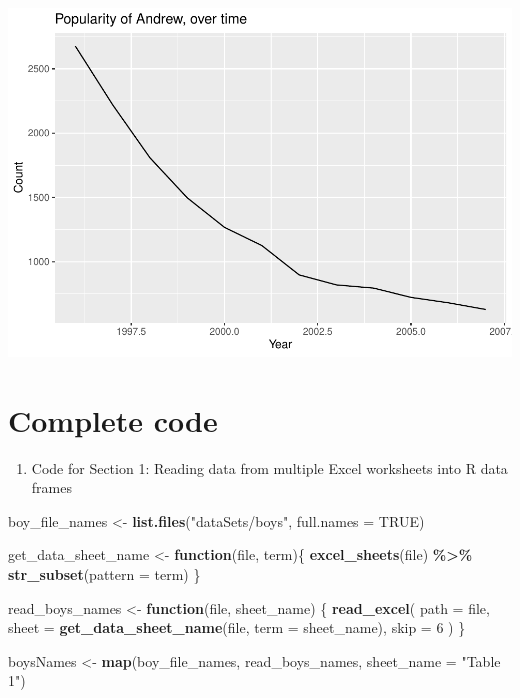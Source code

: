 \documentclass[
]{book}
\newenvironment{Shaded}{\begin{snugshade}}{\end{snugshade}}
\newcommand{\ControlFlowTok}[1]{\textcolor[rgb]{0.13,0.29,0.53}{\textbf{#1}}}
\newcommand{\DataTypeTok}[1]{\textcolor[rgb]{0.13,0.29,0.53}{#1}}
\newcommand{\DecValTok}[1]{\textcolor[rgb]{0.00,0.00,0.81}{#1}}
\newcommand{\KeywordTok}[1]{\textcolor[rgb]{0.13,0.29,0.53}{\textbf{#1}}}
\newcommand{\NormalTok}[1]{#1}
\newcommand{\OperatorTok}[1]{\textcolor[rgb]{0.81,0.36,0.00}{\textbf{#1}}}
\newcommand{\OtherTok}[1]{\textcolor[rgb]{0.56,0.35,0.01}{#1}}
\newcommand{\StringTok}[1]{\textcolor[rgb]{0.31,0.60,0.02}{#1}}
\providecommand{\tightlist}{%
  \setlength{\itemsep}{0pt}\setlength{\parskip}{0pt}}
\begin{document}
\begin{alert}
\includegraphics{R/RDataWrangling/figures/unnamed-chunk-260-1.pdf}

\end{alert}

\hypertarget{complete-code}{%
\section{Complete code}\label{complete-code}}

\begin{enumerate}
\def\labelenumi{\arabic{enumi}.}
\tightlist
\item
  Code for Section 1: Reading data from multiple Excel worksheets into R data frames
\end{enumerate}

\begin{Shaded}
\begin{Highlighting}[]
\NormalTok{boy\_file\_names \textless{}{-}}\StringTok{ }\KeywordTok{list.files}\NormalTok{(}\StringTok{"dataSets/boys"}\NormalTok{, }\DataTypeTok{full.names =} \OtherTok{TRUE}\NormalTok{)}

\NormalTok{get\_data\_sheet\_name \textless{}{-}}\StringTok{ }\ControlFlowTok{function}\NormalTok{(file, term)\{}
  \KeywordTok{excel\_sheets}\NormalTok{(file) }\OperatorTok{\%\textgreater{}\%}\StringTok{ }\KeywordTok{str\_subset}\NormalTok{(}\DataTypeTok{pattern =}\NormalTok{ term)}
\NormalTok{\}}

\NormalTok{read\_boys\_names \textless{}{-}}\StringTok{ }\ControlFlowTok{function}\NormalTok{(file, sheet\_name) \{}
  \KeywordTok{read\_excel}\NormalTok{(}
    \DataTypeTok{path =}\NormalTok{ file,}
    \DataTypeTok{sheet =} \KeywordTok{get\_data\_sheet\_name}\NormalTok{(file, }\DataTypeTok{term =}\NormalTok{ sheet\_name),}
    \DataTypeTok{skip =} \DecValTok{6}
\NormalTok{  )}
\NormalTok{\}}

\NormalTok{boysNames \textless{}{-}}\StringTok{ }\KeywordTok{map}\NormalTok{(boy\_file\_names, read\_boys\_names, }\DataTypeTok{sheet\_name =} \StringTok{"Table 1"}\NormalTok{)}
\end{Highlighting}
\end{Shaded}
\end{document}
